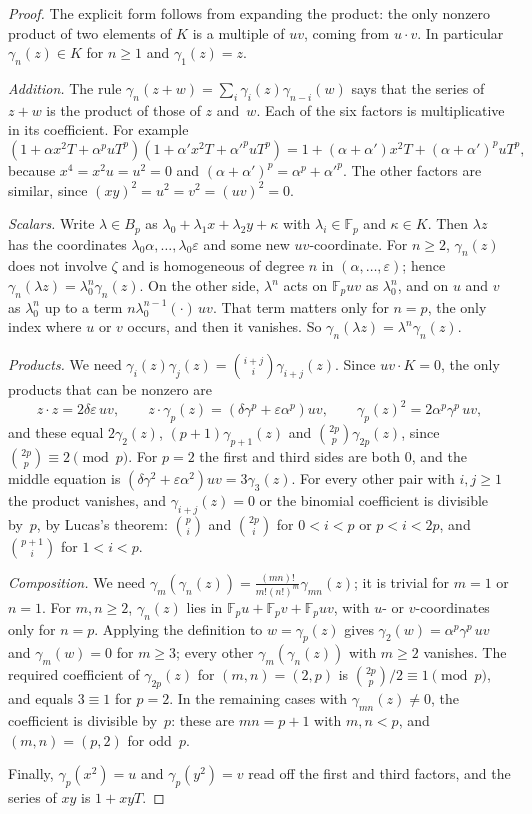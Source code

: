 \documentclass[11pt]{amsart}
\theoremstyle{remark}
\newcommand{\Fp}{\mathbb{F}_p}
\begin{document}
\begin{proof}
The explicit form follows from expanding the product: the only nonzero product of two elements of $K$ is a multiple
of $uv$, coming from $u\cdot v$. In particular $\gamma_n(z)\in K$ for $n\geq1$ and $\gamma_1(z)=z$.

\emph{Addition.} The rule $\gamma_n(z+w)=\sum_i\gamma_i(z)\gamma_{n-i}(w)$ says that the series of $z+w$ is the product
of those of $z$ and~$w$. Each of the six factors is multiplicative in its coefficient. For example
\[
(1+\alpha x^2T+\alpha^puT^p)(1+\alpha'x^2T+\alpha'^puT^p)=1+(\alpha+\alpha')x^2T+(\alpha+\alpha')^puT^p,
\]
because $x^4=x^2u=u^2=0$ and $(\alpha+\alpha')^p=\alpha^p+\alpha'^p$. The other factors are similar, since
$(xy)^2=u^2=v^2=(uv)^2=0$.

\emph{Scalars.} Write $\lambda\in B_p$ as $\lambda_0+\lambda_1x+\lambda_2y+\kappa$ with $\lambda_i\in\Fp$ and $\kappa\in K$.
Then $\lambda z$ has the coordinates $\lambda_0\alpha,\dots,\lambda_0\varepsilon$ and some new $uv$-coordinate. For $n\geq2$,
$\gamma_n(z)$ does not involve $\zeta$ and is homogeneous of degree $n$ in $(\alpha,\dots,\varepsilon)$; hence
$\gamma_n(\lambda z)=\lambda_0^n\gamma_n(z)$. On the other side, $\lambda^n$ acts on $\Fp uv$ as $\lambda_0^n$, and on $u$
and $v$ as $\lambda_0^n$ up to a term $n\lambda_0^{n-1}(\cdot)\,uv$. That term matters only for $n=p$, the only index
where $u$ or $v$ occurs, and then it vanishes. So $\gamma_n(\lambda z)=\lambda^n\gamma_n(z)$.

\emph{Products.} We need $\gamma_i(z)\gamma_j(z)=\binom{i+j}{i}\gamma_{i+j}(z)$. Since $uv\cdot K=0$, the only
products that can be nonzero are
\[
z\cdot z=2\delta\varepsilon\,uv,\qquad z\cdot\gamma_p(z)=(\delta\gamma^p+\varepsilon\alpha^p)uv,\qquad
\gamma_p(z)^2=2\alpha^p\gamma^p\,uv,
\]
and these equal $2\gamma_2(z)$, $(p+1)\gamma_{p+1}(z)$ and $\binom{2p}{p}\gamma_{2p}(z)$, since $\binom{2p}{p}\equiv2\pmod p$.
For $p=2$ the first and third sides are both $0$, and the middle equation is $(\delta\gamma^2+\varepsilon\alpha^2)uv=3\gamma_3(z)$.
For every other pair with $i,j\geq1$ the product vanishes, and $\gamma_{i+j}(z)=0$ or the binomial coefficient is
divisible by~$p$, by Lucas's theorem: $\binom{p}{i}$ and $\binom{2p}{i}$ for $0<i<p$ or $p<i<2p$, and $\binom{p+1}{i}$ for
$1<i<p$.

\emph{Composition.} We need $\gamma_m(\gamma_n(z))=\frac{(mn)!}{m!(n!)^m}\gamma_{mn}(z)$; it is trivial for $m=1$ or
$n=1$. For $m,n\geq2$, $\gamma_n(z)$ lies in $\Fp u+\Fp v+\Fp uv$, with $u$- or $v$-coordinates only for $n=p$. Applying
the definition to $w=\gamma_p(z)$ gives $\gamma_2(w)=\alpha^p\gamma^p\,uv$ and $\gamma_m(w)=0$ for $m\geq3$; every other
$\gamma_m(\gamma_n(z))$ with $m\geq2$ vanishes. The required coefficient of $\gamma_{2p}(z)$ for $(m,n)=(2,p)$ is
$\binom{2p}{p}/2\equiv1\pmod p$, and equals $3\equiv1$ for $p=2$. In the remaining cases with $\gamma_{mn}(z)\neq0$, the
coefficient is divisible by~$p$: these are $mn=p+1$ with $m,n<p$, and $(m,n)=(p,2)$ for odd~$p$.

Finally, $\gamma_p(x^2)=u$ and $\gamma_p(y^2)=v$ read off the first and third factors, and the series of $xy$ is
$1+xyT$.
\end{proof}
\end{document}
